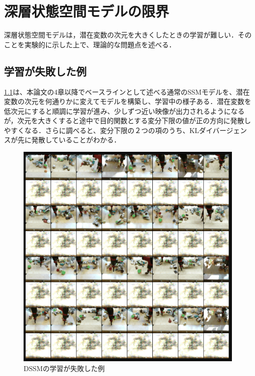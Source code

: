 \chapter{深層状態空間モデルの限界}
\label{chap:baseline}


深層状態空間モデルは，潜在変数の次元を大きくしたときの学習が難しい．そのことを実験的に示した上で、理論的な問題点を述べる．

\section{学習が失敗した例}
\ref{fig:dssm_failure}は、本論文の4章以降でベースラインとして述べる通常のSSMモデルを、潜在変数の次元を何通りかに変えてモデルを構築し、学習中の様子ある．潜在変数を低次元にすると順調に学習が進み、少しずつ近い映像が出力されるようになるが，次元を大きくすると途中で目的関数とする変分下限の値が正の方向に発散しやすくなる．さらに調べると、変分下限の２つの項のうち、KLダイバージェンスが先に発散していることがわかる．

\begin{figure}[tbp]
    \begin{center}
      \includegraphics[width=\linewidth]{./figures/dssm_failure.png}
      \caption{DSSMの学習が失敗した例}
      \label{fig:dssm_failure}
    \end{center}
  \end{figure}

